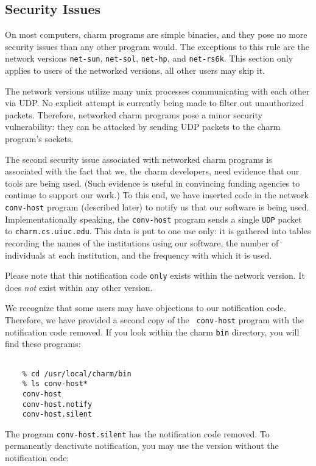 \subsection{Security Issues}

On most computers, charm programs are simple binaries, and they pose
no more security issues than any other program would.  The exceptions
to this rule are the network versions {\tt net-sun}, {\tt net-sol},
{\tt net-hp}, and {\tt net-rs6k}.  This section only applies to users
of the networked versions, all other users may skip it.

The network versions utilize many unix processes communicating with
each other via UDP.  No explicit attempt is currently being made to
filter out unauthorized packets.  Therefore, networked charm programs
pose a minor security vulnerability: they can be attacked by sending
UDP packets to the charm program's sockets.

The second security issue associated with networked charm programs is
associated with the fact that we, the charm developers, need evidence
that our tools are being used.  (Such evidence is useful in convincing
funding agencies to continue to support our work.)  To this end, we
have inserted code in the network {\tt conv-host} program (described
later) to notify us that our software is being used.
Implementationally speaking, the {\tt conv-host} program sends a
single {\tt UDP} packet to {\tt charm.cs.uiuc.edu}.  This data is put
to one use only: it is gathered into tables recording the names of
the institutions using our software, the number of individuals
at each institution, and the frequency with which it is used.

Please note that this notification code {\tt only} exists within the
network version.  It does {\em not} exist within any other version.

We recognize that some users may have objections to our notification
code.  Therefore, we have provided a second copy of the {\tt
conv-host} program with the notification code removed.  If you look
within the charm {\tt bin} directory, you will find these programs:

\begin{verbatim}

    % cd /usr/local/charm/bin
    % ls conv-host*
    conv-host
    conv-host.notify
    conv-host.silent

\end{verbatim}

The program {\tt conv-host.silent} has the notification code removed.  To
permanently deactivate notification, you may use the version without the
notification code:

